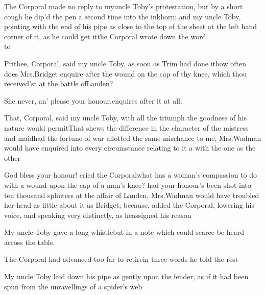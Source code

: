 \documentclass{article}
\begin{document}
The Corporal made no reply to my\break uncle Toby’s protestation, but by a short
cough \tsk
he dip’d the pen a second time into the inkhorn; and my uncle Toby, pointing with
the end of his pipe as close to the top of the sheet at the left hand corner of it,
as he could get it\tsh the Corporal wrote down the word\\ 
\hbox to 

Prithee, Corporal, said my uncle Toby, as soon as Trim had done it\tsh how often
does Mrs.\@ Bridget enquire after the wound on the cap of thy knee, which thou
received’st at the battle of\break Landen?

She never, an’ please your honour,\break enquires after it at all.

That, Corporal, said my uncle Toby, with all the triumph the goodness of his nature
would permit\tsh That shews the difference in the character of the mistress and
maid\tsh had the fortune of war allotted the same mischance to me, Mrs.\@ Wadman
would have enquired into every circumstance relating to it a
with the one as the other\tsh

\tsh God bless your honour! cried the
Corporal\tsh what has a woman’s compassion to do
with a wound upon the cap of a man’s knee? had your
honour’s been shot into ten thousand splinters at the affair
of Landen, Mrs.\@ Wadman would have troubled her head
as little about it as Bridget; because, added the Corporal,
lowering his voice, and speaking very distinctly, as he\break assigned
his reason\tsh{}

\noindent
{}

My uncle Toby gave a long whistle\break\tsh but in a
note which could scarce be heard across the table.

The Corporal had advanced too far to retire\tsh in
three words he told the rest\tsh

My uncle Toby laid down his pipe\break
as gently upon the fender, as if it had\break
been spun from the unravellings of a\break
spider’s web\tsh
\end{document}
